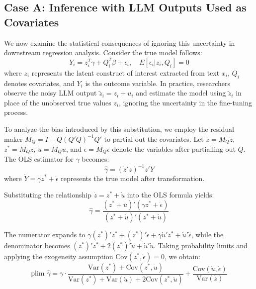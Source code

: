 \documentclass[11pt]{article}
\begin{document}
\subsection{Case A: Inference with LLM Outputs Used as Covariates}

We now examine the statistical consequences of ignoring this uncertainty in downstream regression analysis.
Consider the true model follows:
\begin{equation}
Y_i = z_i^T\gamma + Q_i^T\beta + \epsilon_i, \quad E[\epsilon_i|z_i, Q_i] = 0
\end{equation}
where $z_i$ represents the latent construct of interest extracted from text $x_i$, $Q_i$ denotes covariates, and $Y_i$ is the outcome variable.
In practice, researchers observe the noisy LLM output $\tilde{z}_i = z_i + u_i$ and
estimate the model using $\tilde{z}_i$ in place of the unobserved true values $z_i$, ignoring the uncertainty in the fine-tuning process.


To analyze the bias introduced by this substitution, we employ the residual maker $M_Q = I - Q(Q'Q)^{-1}Q'$ to partial out the covariates. 
Let $\dot{z} = M_Q\tilde{z}$, $z^* = M_Q z$, $\dot{u} = M_Q u$, and $\dot{\epsilon} = M_Q \epsilon$ denote the variables after partialling out $Q$. The OLS estimator for $\gamma$ becomes:
\begin{equation}
\hat{\gamma} = (\dot{z}'\dot{z})^{-1}\dot{z}'\dot{Y}
\end{equation}
where $\dot{Y} = \gamma z^* + \dot{\epsilon}$ represents the true model after transformation.

Substituting the relationship $\dot{z} = z^* + \dot{u}$ into the OLS formula yields:
\begin{equation}
\hat{\gamma} = \frac{(z^* + \dot{u})'(\gamma z^* + \dot{\epsilon})}{(z^* + \dot{u})'(z^* + \dot{u})}
\end{equation}

The numerator expands to $\gamma (z^*)' z^* + (z^*)' \dot{\epsilon} + \gamma \dot{u}' z^* + \dot{u}' \dot{\epsilon}$, while the denominator becomes $(z^*)' z^* + 2(z^*)' \dot{u} + \dot{u}' \dot{u}$. Taking probability limits and applying the exogeneity assumption $\text{Cov}(z^*, \dot{\epsilon}) = 0$, we obtain:
\begin{equation}
\text{plim } \hat{\gamma} = \gamma \cdot \frac{\text{Var}(z^*) + \text{Cov}(z^*, \dot{u})}{\text{Var}(z^*) + \text{Var}(\dot{u}) + 2\text{Cov}(z^*, \dot{u})} + \frac{\text{Cov}(\dot{u}, \dot{\epsilon})}{\text{Var}(\dot{z})} \tag{A1}
\end{equation}
\end{document}
